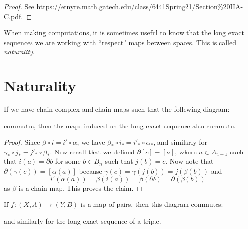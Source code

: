 \begin{proof}
  See \url{https://etnyre.math.gatech.edu/class/6441Spring21/Section%20IIA-C.pdf}.
\end{proof}

\begin{remark}
  When making computations, it is sometimes useful
  to know that the long exact sequences we are working
  with ``respect'' maps between spaces. This is
  called \emph{naturality}.
\end{remark}

\section{Naturality}

\begin{lemma}\label{lem:naturality-lemma}
  If we have chain complex and chain maps such that
  the following diagram:
  \begin{center}
  \end{center}
  commutes, then the maps induced on the long exact
  sequence also commute.
\end{lemma}

\begin{proof}
  Since $\beta \circ i = i' \circ \alpha$,
  we have $\beta_* \circ i_* = i'_* \circ \alpha_*$, and
  similarly for
  $\gamma_* \circ j_* = j'_* \circ \beta_*$. Now
  recall that we defined $\partial [c] = [a]$, where
  $a \in A_{n - 1}$ such that $i(a) = \partial b$
  for some $b \in B_n$ such that $j(b) = c$. Now
  note that $\partial(\gamma(c)) = [\alpha(a)]$
  because $\gamma(c) = \gamma(j(b)) = j(\beta(b))$
  and
  \[
    i'(\alpha(a)) = \beta(i(a)) = \beta(\partial b)
    = \partial(\beta(b))
  \]
  as $\beta$ is a chain map. This proves the claim.
\end{proof}

\begin{theorem}[Naturality]
  If $f : (X, A) \to (Y, B)$ is a map of pairs, then
  this diagram commutes:
  \begin{center}
  \end{center}
  and similarly for the long exact sequence of a
  triple.
\end{theorem}

